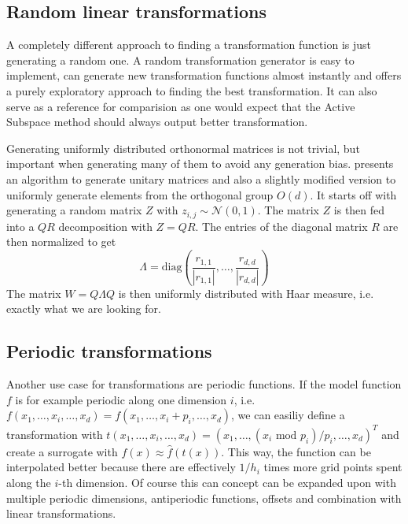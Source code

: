 \documentclass[
  a4paper,  %
  twoside,  %
  bibliography=totoc,
  headsepline,
  cleardoublepage=empty,
  parskip=half,
  draft=false
]{scrbook}
\begin{document}
\subsection{Random linear transformations}
\label{sec:rt}

A completely different approach to finding a transformation function is just generating a random one.
A random transformation generator is easy to implement, can generate new transformation functions almost instantly and offers a purely exploratory approach to finding the best transformation.
It can also serve as a reference for comparision as one would expect that the Active Subspace method should always output better transformation.

Generating uniformly distributed orthonormal matrices is not trivial, but important when generating many of them to avoid any generation bias.
\cite{ABC} presents an algorithm to generate unitary matrices and also a slightly modified version to uniformly generate elements from the orthogonal group $O(d)$.
It starts off with generating a random matrix $Z$ with $z_{i,j} \sim \mathcal{N}\left(0, 1\right)$.
The matrix $Z$ is then fed into a $QR$ decomposition with $Z=QR$.
The entries of the diagonal matrix $R$ are then normalized to get
\begin{equation}
\Lambda=\text{diag}\left(\frac{r_{1,1}}{|r_{1,1}|}, \dots, \frac{r_{d,d}}{|r_{d,d}|}\right)
\end{equation}
The matrix $W=Q \Lambda Q$ is then uniformly distributed with Haar measure, i.e. exactly what we are looking for.



\subsection{Periodic transformations}

Another use case for transformations are periodic functions.
If the model function $f$ is for example periodic along one dimension $i$, i.e. $f(x_1,\dots,x_i,\dots,x_d)=f(x_1,\dots,x_i + p_i, \dots,x_d)$, we can easiliy define a transformation with $t(x_1,\dots,x_i,\dots,x_d)=(x_1,\dots,(x_i\text{ mod } p_i) /p_i, \dots,x_d)^T$ and create a surrogate with $f(x) \approx \hat{f}(t(x))$.
This way, the function can be interpolated better because there are effectively $1 / h_i$ times more grid points spent along the $i$-th dimension.
Of course this can concept can be expanded upon with multiple periodic dimensions, antiperiodic functions, offsets and combination with linear transformations.
\end{document}
